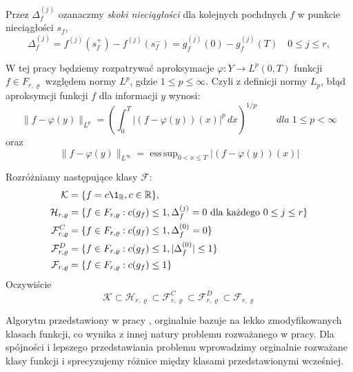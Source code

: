 \documentclass[oik, pdftex, robocza, man]{mgrwms}
\DeclareMathOperator*{\esssup}{ess\,sup}
\begin{document}
    Przez $\Delta_f^{(j)}$ ozanaczmy \emph{skoki nieciągłości} dla kolejnych pochdnych $f$ w punkcie nieciągłości $s_f$,
    \begin{equation*}
        \Delta_f^{(j)} = f^{(j)}(s_f^+) - f^{(j)}(s_f^-) = g_f^{(j)}(0) - g_f^{(j)}(T) \quad 0 \leq j \leq r,
    \end{equation*}

    W tej pracy będziemy rozpatrywać aproksymacje $\varphi : Y \rightarrow L^p(0, T)$ funkcji $f \in F_{r, \varrho}$ względem normy $L^p$, gdzie $1 \leq p \leq \infty$. Czyli z definicji normy $L_{p}$, błąd aproksymcji funkcji $f$ dla informacji $y$ wynosi:
    \begin{equation*}
        \|f-\varphi(y)\|_{L^p} = \left( \int_{0}^{T} |(f-\varphi(y))(x)|^p \,dx  \right)^{1/p} \qquad dla \; 1 \leq p < \infty
    \end{equation*}
    oraz
    \begin{equation*}
        \|f-\varphi(y)\|_{L^\infty} = \esssup_{0 < x \leq T} | (f - \varphi(y))(x) |
    \end{equation*}

    Rozróżniamy następujące klasy $\mathcal{F}$:
    \begin{equation*}
        \begin{split}
            \mathcal{K} & = \{f = c \1_{\R}, c \in \R \}, \\
            \mathcal{H}_{r, \varrho} & = \{ f \in F_{r, \varrho}: c(g_{f}) \leq 1, \Delta_{f}^{(j)} = 0 \text{ dla każdego } 0 \leq j \leq r\} \\
            \mathcal{F}_{r, \varrho}^{C} & = \{ f \in F_{r, \varrho}: c(g_{f}) \leq 1, \Delta_{f}^{(0)} = 0 \} \\
            \mathcal{F}_{r, \varrho}^{D} & = \{ f \in F_{r, \varrho}: c(g_{f}) \leq 1, | \Delta_{f}^{(0)} | \leq 1 \} \\
            \mathcal{F}_{r, \varrho} & = \{ f \in F_{r, \varrho}: c(g_{f}) \leq 1 \} \\
        \end{split}
    \end{equation*}
    Oczywiście
    \begin{equation*}
        \mathcal{K} \subset \mathcal{H}_{r, \varrho} \subset \mathcal{F}_{r, \varrho}^{C} \subset \mathcal{F}_{r, \varrho}^{D} \subset \mathcal{F}_{r, \varrho}
    \end{equation*}


    Algorytm przedstawiony w pracy \cite{CoDF}, orginalnie bazuje na lekko zmodyfikowanych klasach funkcji, co wynika z innej natury problemu rozważanego w pracy. Dla spójności i lepszego przedstawiania problemu wprowadzimy orginalnie rozważane klasy funkcji i sprecyzujemy różnice między klasami przedstawionymi wcześniej.
\end{document}
